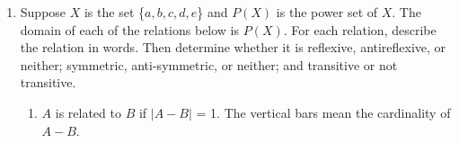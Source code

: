 \documentclass{article}
\begin{document}
\begin{enumerate}
\begin{itemize}
    \item Matrix:\\
        $\begin{pNiceMatrix}[first-row,first-col]
           & 1 & 2 & 6 & 7 & 11  \\
        1  & 1 & 0 & 0 & 1 & 0   \\ 
        2  & 0 & 1 & 0 & 0 & 1   \\
        6  & 0 & 0 & 1 & 0 & 0   \\
        7  & 1 & 0 & 0 & 1 & 0   \\
        11 & 0 & 1 & 0 & 0 & 1   \\
        \end{pNiceMatrix}$
        \hspace{1cm} Matrix = 
        $\begin{cases}
            1: m \equiv n \pmod{3}\\
            0: otherwise\\  
        \end{cases}$ \\
    
    \item \begin{itemize}
        \item R is reflexive as the diagnol of the matrix consist on only 1's.
        \item R is symmetric as since $\forall$ $m$ and $n$, (m,n) and (n,m) are 1's.
        \item R is transitive as $\forall$ $m$ and $n \in R$, if $mRn$ and $nRm$ 
        then $mRm$ and $nRn$.
     \end{itemize}
    \item R is an equivalence relation since it is reflexive,symmetric, and transitive for 
    the reasons mentioned above.
\end{itemize}

\pagebreak %

\item Suppose $X$ is the set \{$a,b,c,d,e$\} and $P(X)$ is the power set of $X$. 
The domain of each of the relations below is $P(X)$. 
For each relation, describe the relation in words. Then determine whether it is 
reflexive, antireflexive, or neither; symmetric, anti-symmetric, or neither; and 
transitive or not transitive.

\begin{enumerate}
    \item $A$ is related to $B$ if $\lvert A-B \rvert$ = 1. The 
    vertical bars mean the cardinality of $A - B$.
    \begin{enumerate}


\end{enumerate}
\end{enumerate}
\end{enumerate}
\end{document}
